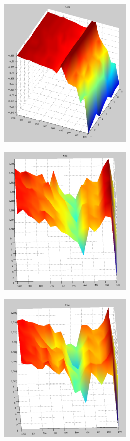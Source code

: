 \documentclass[a4paper,12pt]{article}
\begin{document}
    \bigskip
    \begin{center}
    \includegraphics[width=20em, height=20em]{imat1.png}
    \end{center}

    \bigskip
    \begin{center}
    \includegraphics[width=20em, height=20em]{imat2.png}
    \end{center}

    \begin{center}
    \includegraphics[width=20em, height=20em]{imat3.png}
    \end{center}
\end{document}
